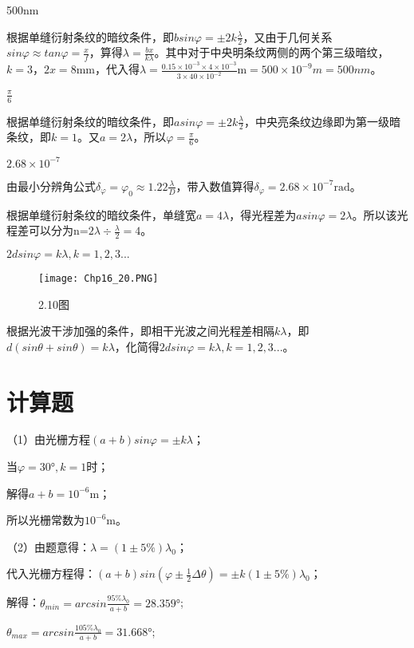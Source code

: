 \exercise 500nm

\solve
根据单缝衍射条纹的暗纹条件，即$bsin\varphi=\pm2k\frac{\lambda}{2}$，又由于几何关系$sin\varphi\approx tan\varphi=\frac{x}{f}$，算得$\lambda=\frac{bx}{k\lambda}$。其中对于中央明条纹两侧的两个第三级暗纹，$k=3$，$2x=8\mathrm{mm}$，代入得$\lambda=\frac{0.15\times10^{-3}\times4\times10^{-3}}{3\times40\times10^{-2}}\mathrm{m}=500\times10^{-9}m=500nm$。

\exercise $\frac{\pi}{6}$

\solve
根据单缝衍射条纹的暗纹条件，即$asin\varphi=\pm2k\frac{\lambda}{2}$，中央亮条纹边缘即为第一级暗条纹，即$k=1$。又$a=2\lambda$，所以$\varphi=\frac{\pi}{6}$。

\exercise $2.68\times10^{-7}$

\solve
由最小分辨角公式$\delta_\varphi=\varphi_0\approx1.22\frac{\lambda}{D}$，带入数值算得$\delta_\varphi=2.68\times10^{-7}\mathrm{rad}$。


\solve
根据单缝衍射条纹的暗纹条件，单缝宽$a=4\lambda$，得光程差为$asin\varphi=2\lambda$。所以该光程差可以分为n=$2\lambda\div\frac{\lambda}{2}=4$。

\exercise $2dsin\varphi=k\lambda,k=1,2,3...$

\solve
\begin{figure}[!h]
\centering
\texttt{[image: Chp16\_20.PNG]}
\caption{2.10图}
\end{figure}

根据光波干涉加强的条件，即相干光波之间光程差相隔$k\lambda$，即$d(sin\theta+sin\theta)=k\lambda$，化简得$2dsin\varphi=k\lambda,k=1,2,3...$。
\section{计算题}
\exercise

\solve
（1）由光栅方程$(a+b)sin\varphi=\pm k\lambda$；

当$\varphi=30°,k=1$时；

解得$a+b=10^{-6}\mathrm{m}$；

所以光栅常数为$10^{-6}\mathrm{m}$。

（2）由题意得：$\lambda=(1\pm5\% ) \lambda_0$；

代入光栅方程得：$(a+b)sin(\varphi\pm\frac{1}{2}\Delta\theta)=\pm k(1\pm5\%)\lambda_0$；

解得：$\theta_{min}=arcsin\frac{95\%\lambda_0}{a+b}=28.359°$;

$\theta_{max}=arcsin\frac{105\%\lambda_0}{a+b}=31.668°$;

